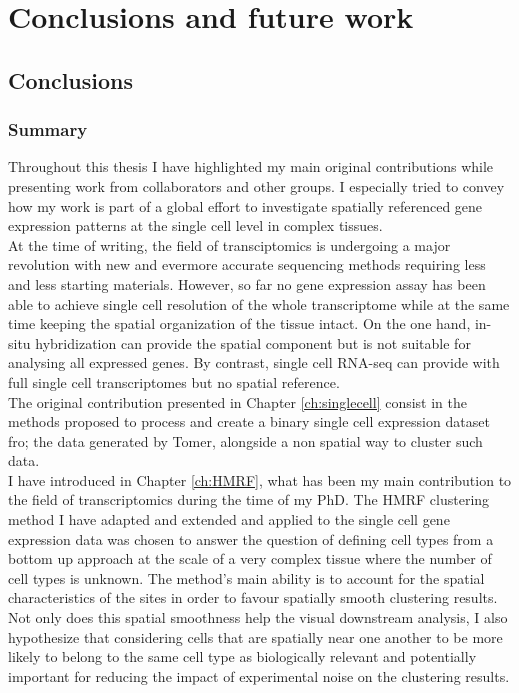 \chapter{Conclusions and future work}\label{ch:conclusions}

\section{Conclusions}

	\subsection{Summary}
	
Throughout this thesis I have highlighted my main original contributions while presenting work from collaborators and other groups. I especially tried to convey how my work is part of a global effort to investigate spatially referenced gene expression patterns at the single cell level in complex tissues.\\

At the time of writing, the field of transciptomics is undergoing a major revolution with new and evermore accurate sequencing methods requiring less and less starting materials. However, so far no gene expression assay has been able to achieve single cell resolution of the whole transcriptome while at the same time keeping the spatial organization of the tissue intact. On the one hand, in-situ hybridization can provide the spatial component but is not suitable for analysing all expressed genes. By contrast, single cell RNA-seq can provide with full single cell transcriptomes but no spatial reference.\\

The original contribution presented in Chapter \ref{ch:singlecell} consist in the methods proposed to process and create a binary single cell expression dataset fro; the data generated by Tomer, alongside a non spatial way to cluster such data.\\

I have introduced in Chapter \ref{ch:HMRF}, what has been my main contribution to the field of transcriptomics during the time of my PhD. The HMRF clustering method I have adapted and extended and applied to the single cell gene expression data was chosen to answer the question of defining cell types from a bottom up approach at the scale of a very complex tissue where the number of cell types is unknown. The method's main ability is to account for the spatial characteristics of the sites in order to favour spatially smooth clustering results. Not only does this spatial smoothness help the visual downstream analysis, I also hypothesize that considering cells that are spatially near one another to be more likely to belong to the same cell type as biologically relevant and potentially important for reducing the impact of experimental noise on the clustering results.\\


